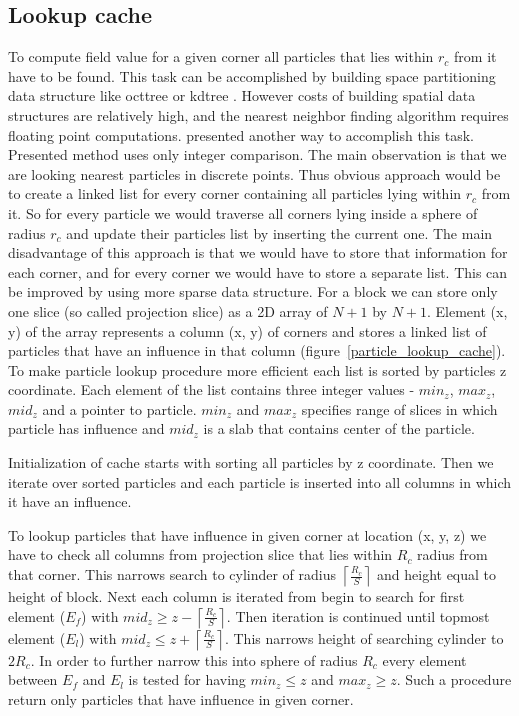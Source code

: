\subsection{Lookup cache}\label{sec:lookupcache}
To compute field value for a given corner all particles that lies within $r_c$ from it have to be found. This task can be accomplished by building space partitioning data structure like octtree or kdtree \cite{Bentley1975}. However costs of building spatial data structures are relatively high, and the nearest neighbor finding algorithm requires floating point computations. \cite{RosenbergBirdwell2008} presented another way to accomplish this task. Presented method uses only integer comparison. The main observation is that we are looking nearest particles in discrete points. Thus obvious approach would be to create a linked list for every corner containing all particles lying within $r_c$ from it. So for every particle we would traverse all corners lying inside a sphere of radius $r_c$ and update their particles list by inserting the current one.  The main disadvantage of this approach is that we would have to store that information for each corner, and for every corner we would have to store a separate list. This can be improved by using more sparse data structure. For a block we can store only one slice (so called projection slice) as a 2D array of $N+1$ by $N+1$. Element (x, y) of the array represents a column (x, y) of corners and stores a linked list of particles that have an influence in that column (figure~\ref{particle_lookup_cache}). To make particle lookup procedure more efficient each list is sorted by particles z coordinate. Each element of the list contains three integer values - $min_z$, $max_z$, $mid_z$ and a pointer to particle. $min_z$ and $max_z$ specifies range of slices in which particle has influence and $mid_z$ is a slab that contains center of the particle. 


Initialization of cache starts with sorting all particles by z coordinate. Then we iterate over sorted particles and each particle is inserted into all columns in which it have an influence. 

To lookup particles that have influence in given corner at location (x, y, z) we have to check all columns from projection slice that lies within $R_c$ radius from that corner. This narrows search to cylinder of radius $\left \lceil \frac{R_c}{S} \right \rceil$ and height equal to height of block. Next each column is iterated from begin to search for first element ($E_f$) with $mid_z \geq z - \left \lceil \frac{R_c}{S} \right \rceil$. Then iteration is continued until topmost element ($E_l$) with $mid_z \leq  z + \left \lceil \frac{R_c}{S} \right \rceil$. This narrows height of searching cylinder to $2R_c$. In order to further narrow this into sphere of radius $R_c$  every element between $E_f$ and $E_l$ is tested for having $min_z \leq z$ and $max_z \geq z$. Such a procedure return only particles that have influence in given corner. 

